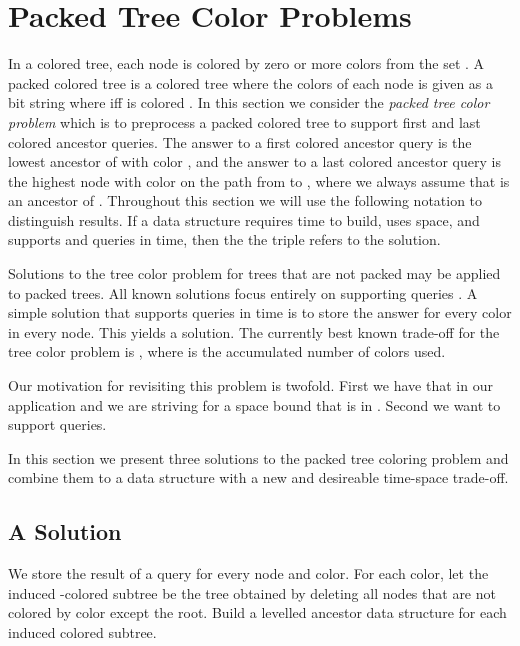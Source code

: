 \documentclass[11pt]{article}
\begin{document}
\section{Packed Tree Color Problems}
In a colored tree, each node is colored by zero or more colors from the set . A packed colored tree is a colored tree where the colors of each node  is given as a bit string  where  iff  is colored . In this section we consider the \textit{packed tree color problem} which is to preprocess a packed colored tree  to support  first and last colored ancestor queries. The answer to a first colored ancestor query  is the lowest ancestor of  with color , and the answer to a last colored ancestor query  is the highest node with color  on the path from  to , where we always assume that  is an ancestor of . Throughout this section we will use the following notation to distinguish results. If a data structure requires  time to build, uses  space, and supports  and  queries in  time, then the the triple  refers to the solution.

Solutions to the tree color problem for trees that are not packed may be applied to packed trees. All known solutions focus entirely on supporting  queries \cite{dietz1991finding,muthukrishnan1996time,ferragina1996efficient,alstrup1998marked}. A simple solution that supports  queries in  time is to store the answer for every color in every node. This yields a  solution. The currently best known trade-off for the tree color problem is   \cite{muthukrishnan1996time}, where  is the accumulated number of colors used. 

Our motivation for revisiting this problem is twofold. First we have that  in our application and we are striving for a space bound that is in . Second we want to support  queries. 

In this section we present three solutions to the packed tree coloring problem and combine them to a data structure with a new and desireable time-space trade-off.



\subsection{A  Solution}


We store the result of a  query for every node and color. For each color, let the induced -colored subtree be the tree obtained by deleting all nodes that are not colored by color  except the root. Build a levelled ancestor data structure for each induced colored subtree.
\end{document}
